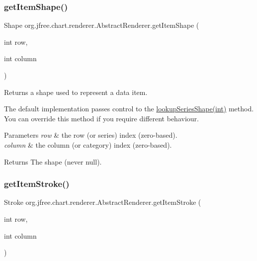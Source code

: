 \subsubsection{\texorpdfstring{get\+Item\+Shape()}{getItemShape()}}
{\footnotesize\ttfamily Shape org.\+jfree.\+chart.\+renderer.\+Abstract\+Renderer.\+get\+Item\+Shape (\begin{DoxyParamCaption}\item[{int}]{row,  }\item[{int}]{column }\end{DoxyParamCaption})}

Returns a shape used to represent a data item. 

The default implementation passes control to the \mbox{\hyperlink{classorg_1_1jfree_1_1chart_1_1renderer_1_1_abstract_renderer_ac5a0b8a1c0dea1813cfbbf36e7cbbd10}{lookup\+Series\+Shape(int)}} method. You can override this method if you require different behaviour.


\begin{DoxyParams}{Parameters}
{\em row} & the row (or series) index (zero-\/based). \\
\hline
{\em column} & the column (or category) index (zero-\/based).\\
\hline
\end{DoxyParams}
\begin{DoxyReturn}{Returns}
The shape (never {\ttfamily null}). 
\end{DoxyReturn}
\mbox{\label{classorg_1_1jfree_1_1chart_1_1renderer_1_1_abstract_renderer_a269e4670b8c0cf62714bbf4040e01cfa}} 
\subsubsection{\texorpdfstring{get\+Item\+Stroke()}{getItemStroke()}}
{\footnotesize\ttfamily Stroke org.\+jfree.\+chart.\+renderer.\+Abstract\+Renderer.\+get\+Item\+Stroke (\begin{DoxyParamCaption}\item[{int}]{row,  }\item[{int}]{column }\end{DoxyParamCaption})}


